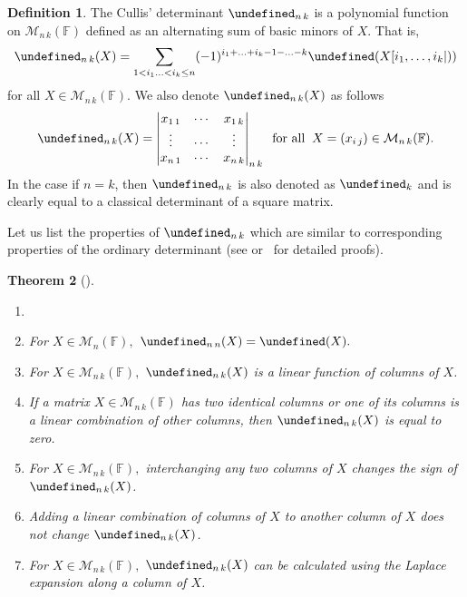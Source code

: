 \documentclass{elsarticle}
\let\det\undefined
\DeclareMathOperator{\det}{det}
\def\F{{\mathbb F}}
\def\M{{\mathcal M}}
\newtheorem{theorem}{Theorem}[section]
\theoremstyle{definition}
\newtheorem{definition}[theorem]{Definition}
\numberwithin{equation}{section}
\begin{document}
\begin{definition}\label{def:DETNK}
The Cullis' determinant $\det_{n\,k}$ is a polynomial function on $\M_{n\,k}(\F)$ defined as an alternating sum of basic minors of $X$. That is,
\begin{equation*}%
\det_{n\,k}(X) = \sum_{1 < i_1 \ldots < i_k \le n} (-1)^{i_1 + \ldots + i_k - 1 - \ldots - k}\det (X[i_1,\ldots, i_k|))
\end{equation*}
for all $X \in \M_{n\,k}(\F).$ We also denote $\det_{n\, k} (X)$ as follows
\[
\det_{n\,k}(X)=\begin{vmatrix}x_{1\,1} & \cdots & x_{1\,k}\\
\vdots & \cdots & \vdots\\
x_{n\,1} & \cdots & x_{n\,k}
\end{vmatrix}_{n\,k}\;\;\mbox{for all}\;\;X = (x_{i\,j}) \in \M_{n\,k}(\F).
\]
In the case if $n = k$, then $\det_{n\,k}$ is also denoted as $\det_{k}$ and is clearly equal to a classical determinant of a square matrix.
\end{definition}

Let us list the properties of $\det_{n\,k}$ which are similar to corresponding properties of the ordinary determinant (see \cite[, , ]{cullis1913} or~\cite{NAKAGAMI2007422} for detailed proofs).

\begin{theorem}[{\cite[Theorem 13, Theorem 16]{NAKAGAMI2007422}}]
\begin{enumerate}
\item[]
\item For $X \in \M_{n}(\mathbb F),$ $\det_{n\,n}(X) = \det (X).$
\item For $X \in \M_{n\,k}(\mathbb F),$ $\det_{n\,k}(X)$ is a linear function of columns of $X$.
\item If a matrix $X \in \M_{n\,k}(\mathbb F)$ has two identical columns or one of its columns is a linear combination of other columns, then $\det_{n\,k}(X)$ is equal to zero.
\item For $X \in \M_{n\,k}(\mathbb F),$ interchanging any two columns of $X$ changes the sign of $\det_{n\,k}(X)$.
\item Adding a linear combination of columns of $X$ to another column of $X$ does not change $\det_{n\,k}(X)$.
\item For $X \in \M_{n\,k}(\mathbb F),$ $\det_{n\,k}(X)$ can be calculated using the Laplace expansion along a column of $X$. %
\end{enumerate}
\end{theorem}
\end{document}
